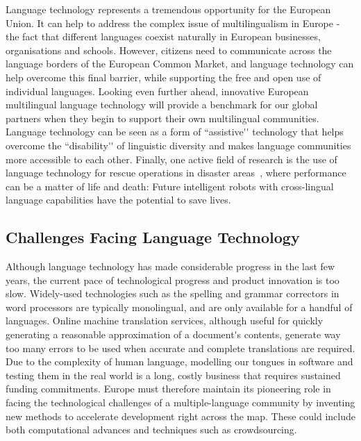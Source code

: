 \begin{multicols}{2}
Language technology represents a tremendous opportunity for the European Union. It can help to address the complex issue of multilingualism in Europe - the fact that different languages coexist naturally in European businesses, organisations and schools. However, citizens need to communicate across the language borders of the European Common Market, and language technology can help overcome this final barrier, while supporting the free and open use of individual languages. Looking even further ahead, innovative European multilingual language technology will provide a benchmark for our global partners when they begin to support their own multilingual communities. Language technology can be seen as a form of ``assistive{\mbox '}{\mbox '} technology that helps overcome the ``disability{\mbox '}{\mbox '} of linguistic diversity and makes language communities more accessible to each other. Finally, one active field of research is the use of language technology for rescue operations in disaster areas~\cite{resnick2011}, where performance can be a matter of life and death: Future intelligent robots with cross-lingual language capabilities have the potential to save lives.

\subsection{Challenges Facing Language Technology}

Although language technology has made considerable progress in the
last few years, the current pace of technological progress and product
innovation is too slow. Widely-used technologies such as the spelling
and grammar correctors in word processors are typically monolingual,
and are only available for a handful of languages. Online machine
translation services, although useful for quickly generating a
reasonable approximation of a document{\mbox '}s contents, generate way too
many errors to be used when accurate and complete translations are
required. Due to the complexity of human language, modelling our
tongues in software and testing them in the real world is a long,
costly business that requires sustained funding commitments. Europe
must therefore maintain its pioneering role in facing the
technological challenges of a multiple-language community by inventing
new methods to accelerate development right across the map. These
could include both computational advances and techniques such as
crowdsourcing.



\end{multicols}
